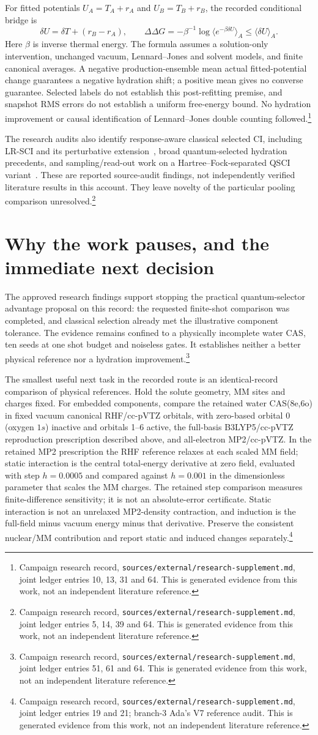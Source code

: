 \documentclass{article}
\newcommand{\record}[1]{\footnote{Campaign research record, \texttt{sources/external/research-supplement.md}, #1. This is generated evidence from this work, not an independent literature reference.}}
\begin{document}
For fitted potentials \(U_A=T_A+r_A\) and \(U_B=T_B+r_B\), the recorded conditional bridge is
\[
 \delta U=\delta T+(r_B-r_A),\qquad
 \Delta\Delta G=-\beta^{-1}\log\langle e^{-\beta\delta U}\rangle_A
 \leq\langle\delta U\rangle_A.
\]
Here \(\beta\) is inverse thermal energy. The formula assumes a solution-only intervention, unchanged vacuum, Lennard--Jones and solvent models, and finite canonical averages. A negative production-ensemble mean actual fitted-potential change guarantees a negative hydration shift; a positive mean gives no converse guarantee. Selected labels do not establish this post-refitting premise, and snapshot RMS errors do not establish a uniform free-energy bound. No hydration improvement or causal identification of Lennard--Jones double counting followed.\record{joint ledger entries 10, 13, 31 and 64}

The research audits also identify response-aware classical selected CI, including LR-SCI and its perturbative extension~\cite{LR,LRPT}, broad quantum-selected hydration precedents, and sampling/read-out work on a Hartree--Fock-separated QSCI variant~\cite{readout}. These are reported source-audit findings, not independently verified literature results in this account. They leave novelty of the particular pooling comparison unresolved.\record{joint ledger entries 5, 14, 39 and 64}

\section{Why the work pauses, and the immediate next decision}
The approved research findings support stopping the practical quantum-selector advantage proposal on this record: the requested finite-shot comparison was completed, and classical selection already met the illustrative component tolerance. The evidence remains confined to a physically incomplete water CAS, ten seeds at one shot budget and noiseless gates. It establishes neither a better physical reference nor a hydration improvement.\record{joint ledger entries 51, 61 and 64}

The smallest useful next task in the recorded route is an identical-record comparison of physical references. Hold the solute geometry, MM sites and charges fixed. For embedded components, compare the retained water CAS(8e,6o) in fixed vacuum canonical RHF/cc-pVTZ orbitals, with zero-based orbital 0 (oxygen \(1s\)) inactive and orbitals 1--6 active, the full-basis B3LYP5/cc-pVTZ reproduction prescription described above, and all-electron MP2/cc-pVTZ. In the retained MP2 prescription the RHF reference relaxes at each scaled MM field; static interaction is the central total-energy derivative at zero field, evaluated with step \(h=0.0005\) and compared against \(h=0.001\) in the dimensionless parameter that scales the MM charges. The retained step comparison measures finite-difference sensitivity; it is not an absolute-error certificate. Static interaction is not an unrelaxed MP2-density contraction, and induction is the full-field minus vacuum energy minus that derivative. Preserve the consistent nuclear/MM contribution and report static and induced changes separately.\record{joint ledger entries 19 and 21; branch-3 Ada's V7 reference audit}
\end{document}
